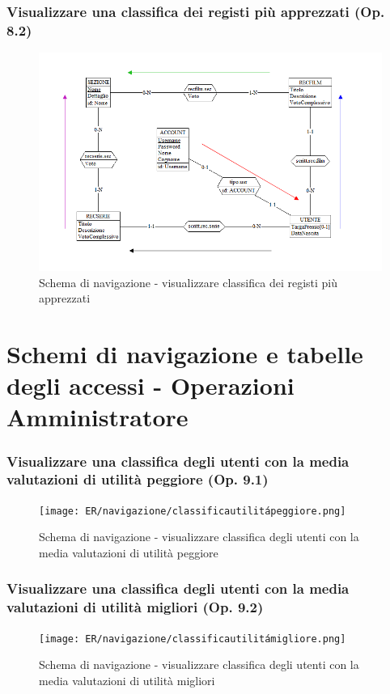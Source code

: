 \documentclass[a4paper,12pt]{report}
\begin{document}
	\subsubsection{Visualizzare una classifica dei registi più apprezzati (Op. 8.2)}
	\begin{figure}[H]
		\centering
		\includegraphics[width=450pt]{ER/navigazione/classificaregisti.png}
		\caption{Schema di navigazione - visualizzare classifica dei registi più apprezzati}
	\end{figure}
	
	\section{Schemi di navigazione e tabelle degli accessi - Operazioni Amministratore}
	\subsubsection{Visualizzare una classifica degli utenti con la media valutazioni di utilità peggiore (Op. 9.1)}
	\begin{figure}[H]
		\centering
		\texttt{[image: ER/navigazione/classificautilitápeggiore.png]}
		\caption{Schema di navigazione - visualizzare classifica degli utenti con la media valutazioni di utilità peggiore}
	\end{figure}
	
	\subsubsection{Visualizzare una classifica degli utenti con la media valutazioni di utilità migliori (Op. 9.2)}
	\begin{figure}[H]
		\centering
		\texttt{[image: ER/navigazione/classificautilitámigliore.png]}
		\caption{Schema di navigazione - visualizzare classifica degli utenti con la media valutazioni di utilità migliori}
	\end{figure}
	
\end{document}
